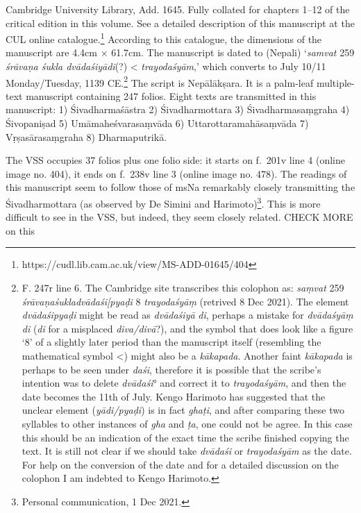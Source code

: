 \documentclass[11pt]{book}
\begin{document}
Cambridge University Library, Add. 1645. Fully collated for chapters
1--12 of the critical edition in this volume. See a detailed description
of this manuscript at the CUL online catalogue.\footnote{https://cudl.lib.cam.ac.uk/view/MS-ADD-01645/404}
According to this catalogue, the dimensions of the manuscript are 4.4cm
× 61.7cm. The manuscript is dated to (Nepali) `\emph{samvat} 259
\emph{śrāvaṇa śukla dvādaśiyādi}(?) \textless{} \emph{trayodaśyām},'
which converts to July 10/11 Monday/Tuesday, 1139 CE.\footnote{F. 247r
  line 6. The Cambridge site transcribes this colophon as: \emph{saṃvat}
  259 \emph{śrāvaṇaśukladvādaśi{[}pyaḍi} 8 \emph{trayodaśyāṃ} (retrived
  8 Dec 2021). The element \emph{dvādaśipyaḍi} might be read as
  \emph{dvādaśiyā} \emph{di}, perhaps a mistake for \emph{dvādaśyāṃ}
  \emph{di} (\emph{di} for a misplaced \emph{diva/divā}?), and the
  symbol that does look like a figure `8' of a slightly later period
  than the manuscript itself (resembling the mathematical symbol
  \textless{}) might also be a \emph{kākapada}. Another faint
  \emph{kākapada} is perhaps to be seen under \emph{daśi}, therefore it
  is possible that the scribe's intention was to delete \emph{dvādaśi}°
  and correct it to \emph{trayodaśyām}, and then the date becomes the
  11th of July. Kengo Harimoto has suggested that the unclear element
  (\emph{yādi/pyaḍi}) is in fact \emph{ghaṭi}, and after comparing these
  two syllables to other instances of \emph{gha} and \emph{ṭa}, one
  could not be agree. In this case this should be an indication of the
  exact time the scribe finished copying the text. It is still not clear
  if we should take \emph{dvādaśi} or \emph{trayodaśyām} as the date.
  For help on the conversion of the date and for a detailed discussion
  on the colophon I am indebted to Kengo Harimoto.} The script is
Nepālākṣara. It is a palm-leaf multiple-text manuscript containing 247
folios. Eight texts are transmitted in this manuscript: 1)
Śivadharmaśāstra 2) Śivadharmottara 3) Śivadharmasaṃgraha 4) Śivopaniṣad
5) Umāmaheśvarasaṃvāda 6) Uttarottaramahāsaṃvāda 7) Vṛṣasārasaṃgraha 8)
Dharmaputrikā.

The VSS occupies 37 folios plus one folio side: it starts on f.~201v
line 4 (online image no. 404), it ends on f.~238v line 3 (online image
no. 478). The readings of this manuscript seem to follow those of msNa
remarkably closely transmitting the Śivadharmottara (as observed by De
Simini and Harimoto)\footnote{Personal communication, 1 Dec 2021.}. This
is more difficult to see in the VSS, but indeed, they seem closely
related. CHECK MORE on this
\end{document}
